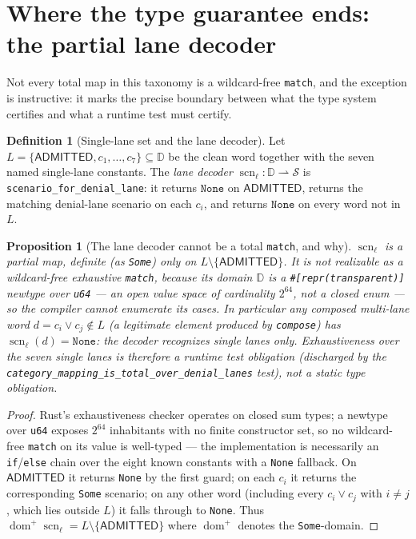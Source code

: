 \documentclass[11pt,oneside]{book}
\theoremstyle{definition}
\newtheorem{definition}{Definition}[chapter]
\theoremstyle{plain}
\newtheorem{proposition}[theorem]{Proposition}
\theoremstyle{remark}
\DeclareMathOperator{\dom}{dom}
\newcommand{\code}[1]{\texttt{#1}}
\newcommand{\Deny}{\mathbb{D}}                 %
\newcommand{\Adml}{\mathsf{ADMITTED}}          %
\newcommand{\Scnset}{\mathcal{S}}              %
\DeclareMathOperator{\scnop}{scn}
\begin{document}
\section{Where the type guarantee ends: the partial lane decoder}

Not every total map in this taxonomy is a wildcard-free \code{match}, and the exception is
instructive: it marks the precise boundary between what the type system certifies and what a
runtime test must certify.

\begin{definition}[Single-lane set and the lane decoder]\label{def:decoder}
Let $L=\{\Adml,c_1,\dots,c_7\}\subseteq\Deny$ be the clean word together with the seven named
single-lane constants. The \emph{lane decoder}
$\scnop_\ell:\Deny\rightharpoonup\Scnset$ is \code{scenario\_for\_denial\_lane}: it returns
$\code{None}$ on $\Adml$, returns the matching denial-lane scenario on each $c_i$, and returns
$\code{None}$ on every word not in $L$.
\end{definition}

\begin{proposition}[The lane decoder cannot be a total \texttt{match}, and why]\label{prop:partial}
$\scnop_\ell$ is a partial map, definite (as \code{Some}) only on $L\setminus\{\Adml\}$. It is
\emph{not} realizable as a wildcard-free exhaustive \code{match}, because its domain $\Deny$ is
a \code{\#[repr(transparent)]} newtype over \code{u64} --- an open value space of cardinality
$2^{64}$, not a closed enum --- so the compiler cannot enumerate its cases. In particular any
composed multi-lane word $d=c_i\lor c_j\notin L$ (a legitimate element produced by
\code{compose}) has $\scnop_\ell(d)=\code{None}$: the decoder recognizes single lanes only.
Exhaustiveness over the seven single lanes is therefore a \emph{runtime test obligation}
(discharged by the \code{category\_mapping\_is\_total\_over\_denial\_lanes} test), not a static
type obligation.
\end{proposition}

\begin{proof}
Rust's exhaustiveness checker operates on closed sum types; a newtype over \code{u64} exposes
$2^{64}$ inhabitants with no finite constructor set, so no wildcard-free \code{match} on its
value is well-typed --- the implementation is necessarily an \code{if}/\code{else} chain over
the eight known constants with a \code{None} fallback. On $\Adml$ it returns \code{None} by the
first guard; on each $c_i$ it returns the corresponding \code{Some} scenario; on any other word
(including every $c_i\lor c_j$ with $i\ne j$, which lies outside $L$) it falls through to
\code{None}. Thus $\dom^{+}\scnop_\ell=L\setminus\{\Adml\}$ where $\dom^{+}$ denotes the
\code{Some}-domain. \end{proof}
\end{document}
